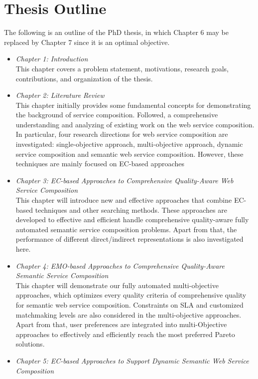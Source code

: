 \section{Thesis Outline}

The following is an outline of the PhD thesis,  in which Chapter 6 may be replaced by Chapter 7 since it is an optimal objective.

\begin{itemize}
 \item \textit{Chapter 1: Introduction}\\
 This chapter covers a problem statement, motivations, research goals, contributions, and organization of the thesis.
 \item \textit{Chapter 2: Literature Review}\\
This chapter initially provides some fundamental concepts for demonstrating the background of service composition. Followed, a comprehensive understanding and analyzing of existing work on the web service composition.  In particular, four research directions for web service composition are investigated: single-objective approach, multi-objective approach, dynamic service composition and semantic web service composition.  However, these techniques are mainly focused on EC-based approaches
 \item \textit{Chapter 3: EC-based Approaches to Comprehensive Quality-Aware Web Service Composition}\\
This chapter will introduce new and effective approaches that combine EC-based techniques and other searching methods. These approaches are developed to effective and efficient handle comprehensive quality-aware fully automated semantic service composition problems. Apart from that, the performance of different direct/indirect representations is also investigated here.
 \item \textit{Chapter 4: EMO-based Approaches to Comprehensive Quality-Aware Semantic Service Composition}\\
This chapter will demonstrate our fully automated multi-objective approaches, which optimizes every quality criteria of comprehensive quality for semantic web service composition. Constraints on SLA and customized matchmaking levels are also considered in the multi-objective approaches. Apart from that, user preferences are integrated into multi-Objective approaches to effectively and efficiently reach the most preferred Pareto solutions.
 \item \textit{Chapter 5: EC-based Approaches to Support Dynamic Semantic Web Service Composition}\\

\end{itemize}
